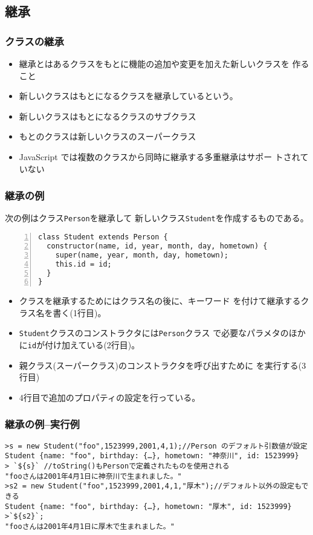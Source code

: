 \subsection{継承}
\begin{frame}[containsverbatim]
 \frametitle{クラスの継承}
 \begin{itemize}
  \item 継承とはあるクラスをもとに機能の追加や変更を加えた新しいクラスを
        作ること
  \item 新しいクラスはもとになるクラスを継承しているという。
  \item 新しいクラスはもとになるクラスのサブクラス
  \item もとのクラスは新しいクラスのスーパークラス
  \item JavaScript では複数のクラスから同時に継承する多重継承はサポー
トされていない
 \end{itemize}
 \end{frame}
\begin{frame}[containsverbatim]
 \frametitle{継承の例}
  次の例はクラス\texttt{Person}を継承して
  新しいクラス\texttt{Student}を作成するものである。
 {\small
\begin{Verbatim}[numbers=left]
class Student extends Person {
  constructor(name, id, year, month, day, hometown) {
    super(name, year, month, day, hometown);
    this.id = id;
  }
}
\end{Verbatim}
 }
  \begin{itemize}
   \item クラスを継承するためにはクラス名の後に、キーワード
         を付けて継承するクラス名を書く(1行目)。
   \item \texttt{Student}クラスのコンストラクタには\texttt{Person}クラス
         で必要なパラメタのほかに\texttt{id}が付け加えている(2行目)。
   \item 親クラス(スーパークラス)のコンストラクタを呼び出すために
         を実行する(3行目)
   \item 4行目で追加のプロパティの設定を行っている。
  \end{itemize}
 \end{frame}
\begin{frame}[containsverbatim]
 \frametitle{継承の例--実行例}
 {\scriptsize
\begin{Verbatim}
>s = new Student("foo",1523999,2001,4,1);//Person のデフォルト引数値が設定
Student {name: "foo", birthday: {…}, hometown: "神奈川", id: 1523999}
> `${s}` //toString()もPersonで定義されたものを使用される
"fooさんは2001年4月1日に神奈川で生まれました。"
>s2 = new Student("foo",1523999,2001,4,1,"厚木");//デフォルト以外の設定もできる
Student {name: "foo", birthday: {…}, hometown: "厚木", id: 1523999}
>`${s2}`;
"fooさんは2001年4月1日に厚木で生まれました。"
\end{Verbatim}
 }
 \end{frame}
